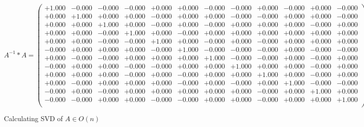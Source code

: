 \documentclass[9pt]{article}
\theoremstyle{plain}
\theoremstyle{definition}
\theoremstyle{remark}
\numberwithin{equation}{section}
\begin{document}
$A^{-1} *A = \left(
\begin{array}{
cccccccccccc}
+1.000 & -0.000 & -0.000 & -0.000 & +0.000 & +0.000 & -0.000 & -0.000 & +0.000 & -0.000 & +0.000 & -0.000 \\
+0.000 & +1.000 & +0.000 & +0.000 & -0.000 & +0.000 & +0.000 & -0.000 & -0.000 & +0.000 & +0.000 & -0.000 \\
+0.000 & +0.000 & +1.000 & +0.000 & -0.000 & +0.000 & -0.000 & +0.000 & +0.000 & +0.000 & -0.000 & +0.000 \\
+0.000 & +0.000 & -0.000 & +1.000 & +0.000 & -0.000 & +0.000 & +0.000 & +0.000 & +0.000 & +0.000 & +0.000 \\
+0.000 & +0.000 & -0.000 & -0.000 & +1.000 & +0.000 & -0.000 & +0.000 & -0.000 & +0.000 & +0.000 & +0.000 \\
-0.000 & +0.000 & +0.000 & +0.000 & -0.000 & +1.000 & -0.000 & -0.000 & -0.000 & +0.000 & -0.000 & -0.000 \\
+0.000 & -0.000 & -0.000 & +0.000 & +0.000 & +0.000 & +1.000 & -0.000 & -0.000 & +0.000 & -0.000 & +0.000 \\
-0.000 & +0.000 & +0.000 & -0.000 & -0.000 & +0.000 & +0.000 & +1.000 & +0.000 & +0.000 & -0.000 & +0.000 \\
+0.000 & +0.000 & +0.000 & -0.000 & +0.000 & -0.000 & +0.000 & +0.000 & +1.000 & +0.000 & -0.000 & +0.000 \\
+0.000 & -0.000 & +0.000 & +0.000 & +0.000 & -0.000 & +0.000 & -0.000 & +0.000 & +1.000 & -0.000 & -0.000 \\
-0.000 & +0.000 & -0.000 & +0.000 & +0.000 & +0.000 & +0.000 & +0.000 & -0.000 & +0.000 & +1.000 & +0.000 \\
-0.000 & -0.000 & +0.000 & +0.000 & -0.000 & -0.000 & +0.000 & +0.000 & -0.000 & +0.000 & +0.000 & +1.000 \\
\end{array}
\right)$ \newline 

Calculating SVD of  $A \in O(n)$
\end{document}
